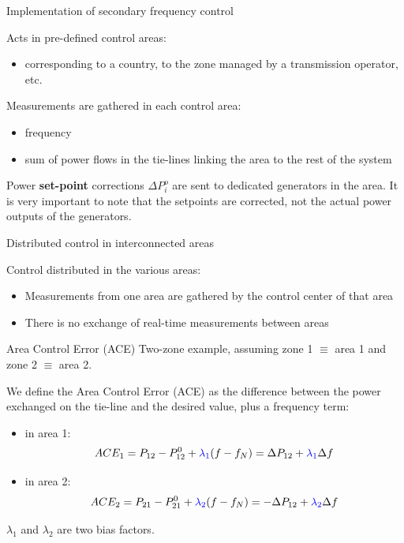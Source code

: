 \begin{frame}{Implementation of secondary frequency control}
    
Acts in pre-defined control areas: 
\begin{itemize}
    \item corresponding to a country, to the zone managed by a transmission operator, etc. 
\end{itemize}

Measurements are gathered in each control area: 
\begin{itemize}
    \item frequency 
    \item sum of power flows in the tie-lines linking the area to the rest of the system 
\end{itemize}

Power \textbf{set-point} corrections $\Delta P_i^o$ are sent to dedicated generators in the area.
It is very important to note that the setpoints are corrected, not the actual power outputs of the generators.
    
\end{frame}



\begin{frame}{Distributed control in interconnected areas}
    
    Control distributed in the various areas: 
    \begin{itemize}
      \item Measurements from one area are gathered by the control center of that area 
      \item There is no exchange of real-time measurements between areas 
    \end{itemize}
\end{frame}



\begin{frame}{Area Control Error (ACE)}
Two-zone example, assuming zone 1 $\equiv$ area 1 and zone 2 $\equiv$ area 2. 

We define the Area Control Error (ACE) as the difference between the power exchanged on the tie-line and the desired value, plus a frequency term:  
    \begin{itemize}
        \item in area 1: $$ACE_1 = P_{12} - P_{12}^0 + {\color{blue} \lambda_1}(f - f_N) = \Delta P_{12} + {\color{blue}\lambda_1} \Delta f$$ 
        \item in area 2: $$ACE_2 = P_{21} - P_{21}^0 + {\color{blue} \lambda_2}(f - f_N) = -\Delta P_{12} + {\color{blue}\lambda_2} \Delta f$$
         
    \end{itemize}
 {\color{blue}$\lambda_1$} and {\color{blue}$\lambda_2$} are two bias factors.
\end{frame}

